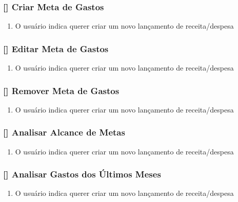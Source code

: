 \documentclass[a4paper]{abnt}
\begin{document}
\subsubsection{[\UC] Criar Meta de Gastos}
\begin{enumerate}[itemsep=-1ex]
	\item O usuário indica querer criar um novo lançamento de receita/despesa
\end{enumerate}

\subsubsection{[\UC] Editar Meta de Gastos}
\begin{enumerate}[itemsep=-1ex]
	\item O usuário indica querer criar um novo lançamento de receita/despesa
\end{enumerate}

\subsubsection{[\UC] Remover Meta de Gastos}
\begin{enumerate}[itemsep=-1ex]
	\item O usuário indica querer criar um novo lançamento de receita/despesa
\end{enumerate}

\subsubsection{[\UC] Analisar Alcance de Metas}
\begin{enumerate}[itemsep=-1ex]
	\item O usuário indica querer criar um novo lançamento de receita/despesa
\end{enumerate}

\subsubsection{[\UC] Analisar Gastos dos Últimos Meses}
\begin{enumerate}[itemsep=-1ex]
	\item O usuário indica querer criar um novo lançamento de receita/despesa
\end{enumerate}
\end{document}
